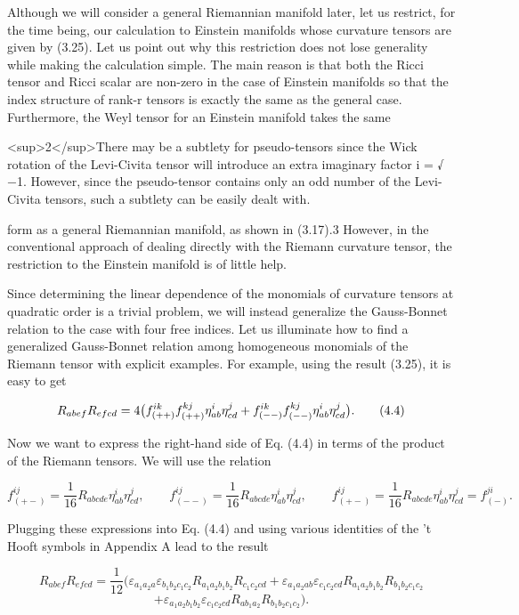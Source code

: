 \documentclass{article}
\begin{document}
Although we will consider a general Riemannian manifold later, let us restrict, for the time being, our calculation to Einstein manifolds whose curvature tensors are given by (3.25). Let us point out why this restriction does not lose generality while making the calculation simple. The main reason is that both the Ricci tensor and Ricci scalar are non-zero in the case of Einstein manifolds so that the index structure of rank-r tensors is exactly the same as the general case. Furthermore, the Weyl tensor for an Einstein manifold takes the same

<sup>2</sup>There may be a subtlety for pseudo-tensors since the Wick rotation of the Levi-Civita tensor will introduce an extra imaginary factor i = √ −1. However, since the pseudo-tensor contains only an odd number of the Levi-Civita tensors, such a subtlety can be easily dealt with.

form as a general Riemannian manifold, as shown in (3.17).3 However, in the conventional approach of dealing directly with the Riemann curvature tensor, the restriction to the Einstein manifold is of little help.

Since determining the linear dependence of the monomials of curvature tensors at quadratic order is a trivial problem, we will instead generalize the Gauss-Bonnet relation to the case with four free indices. Let us illuminate how to find a generalized Gauss-Bonnet relation among homogeneous monomials of the Riemann tensor with explicit examples. For example, using the result (3.25), it is easy to get

$$R_{abef}R_{efcd}=4\big{(}f^{ik}_{(++)}f^{kj}_{(++)}\eta^{i}_{ab}\eta^{j}_{cd}+f^{ik}_{(--)}f^{kj}_{(--)}\eta^{i}_{ab}\eta^{j}_{cd}\big{)}.\tag{4.4}$$

Now we want to express the right-hand side of Eq. (4.4) in terms of the product of the Riemann tensors. We will use the relation

$$f^{ij}_{(+-)}=\frac{1}{16}R_{abcde}\eta^{i}_{ab}\eta^{j}_{cd},\qquad f^{ij}_{(--)}=\frac{1}{16}R_{abcde}\eta^{i}_{ab}\eta^{j}_{cd},\qquad f^{ij}_{(+-)}=\frac{1}{16}R_{abcde}\eta^{i}_{ab}\eta^{j}_{cd}=f^{ji}_{(-)}.\tag{4.5}$$

Plugging these expressions into Eq. (4.4) and using various identities of the 't Hooft symbols in Appendix A lead to the result

$$R_{abef}R_{efcd}=\frac{1}{12}(\varepsilon_{a_{1}a_{2}a}\varepsilon_{b_{1}b_{2}c_{1}c_{2}}R_{a_{1}a_{2}b_{1}b_{2}}R_{c_{1}c_{2}cd}+\varepsilon_{a_{1}a_{2}ab}\varepsilon_{c_{1}c_{2}cd}R_{a_{1}a_{2}b_{1}b_{2}}R_{b_{1}b_{2}c_{1}c_{2}}\tag{4.6}$$ $$+\varepsilon_{a_{1}a_{2}b_{1}b_{2}}\varepsilon_{c_{1}c_{2}cd}R_{ab_{1}a_{2}}R_{b_{1}b_{2}c_{1}c_{2}}).$$
\end{document}
